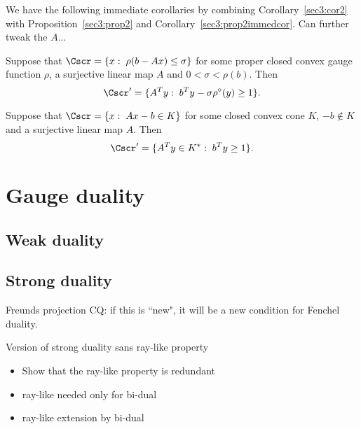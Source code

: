 \documentclass{siamltex}   %
\begin{document}
  We have the following immediate corollaries
  by combining Corollary~\ref{sec3:cor2} with Proposition~\ref{sec3:prop2} and Corollary~\ref{sec3:prop2immedcor}.
  {\color{red} Can further tweak the $A$...}
  \begin{corollary}
    Suppose that $\Cscr = \{x :\; \rho(b-Ax)\le \sigma\}$ for some proper closed convex gauge function $\rho$,
    a surjective linear map $A$ and $0 < \sigma < \rho(b)$.
    Then
    \[
    \Cscr' = \{A^Ty:\; b^Ty - \sigma\rho^\circ(y)\ge 1\}.
    \]
  \end{corollary}
  \begin{corollary}
    Suppose that $\Cscr = \{x:\; Ax - b\in K\}$ for some closed convex cone $K$, $-b\notin K$ and a surjective linear map $A$. Then
    \[
    \Cscr' = \{A^Ty\in K^*:\; b^Ty \ge 1\}.
    \]
  \end{corollary}

  \section{Gauge duality}
  \label{sec:gauge-duality}

  \subsection{Weak duality}
  \label{sec:weak-duality}

  \subsection{Strong duality}
  \label{sec:strong-duality}

  \begin{itemize}{\color{red}
  \item Freunds projection CQ: if this is ``new", it will be a new condition for Fenchel duality.}
  {\color{green}
  \item Version of strong duality sans ray-like property
    \begin{itemize}
    \item Show that the ray-like property is redundant
    \item ray-like needed only for bi-dual
    \item ray-like extension by bi-dual
    \end{itemize}}
  \end{itemize}
\end{document}

